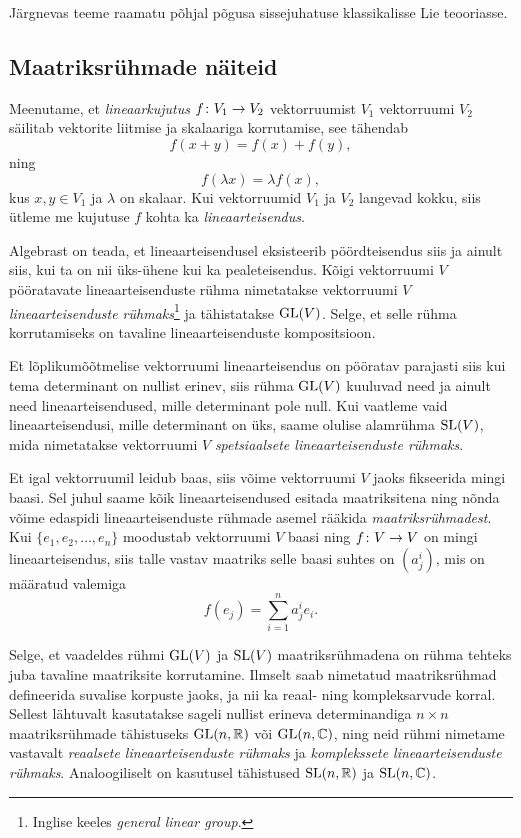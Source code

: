Järgnevas teeme raamatu \cite{johan1989survey} põhjal põgusa sissejuhatuse
klassikalisse Lie teooriasse. 

\subsection{Maatriksrühmade näiteid}

Meenutame, et \emph{lineaarkujutus}
$f \colon V_1 \to V_2$ vektorruumist $V_1$ vektorruumi $V_2$ säilitab
vektorite liitmise ja skalaariga korrutamise, see tähendab
\[ f(x + y) = f(x) + f(y), \]
ning
\[ f(\lambda x) = \lambda f(x), \]
kus $x, y \in V_1$ ja $\lambda$ on skalaar. Kui vektorruumid $V_1$ ja $V_2$
langevad kokku, siis ütleme me kujutuse $f$ kohta ka \emph{lineaarteisendus}.

Algebrast on teada, et lineaarteisendusel eksisteerib pöördteisendus siis ja
ainult siis, kui ta on nii üks-ühene kui ka pealeteisendus. Kõigi vektorruumi $V$
pööratavate lineaarteisenduste rühma nimetatakse vektorruumi $V$
\emph{lineaarteisenduste rühmaks}\footnote{Inglise keeles
\emph{general linear group}.} ja tähistatakse $\operatorname{GL}(V)$. Selge, et selle
rühma korrutamiseks on tavaline lineaarteisenduste kompositsioon.

Et lõplikumõõtmelise vektorruumi lineaarteisendus on pööratav parajasti siis
kui tema determinant on nullist erinev, siis rühma $\operatorname{GL}(V)$ kuuluvad
need ja ainult need lineaarteisendused, mille determinant pole null.
Kui vaatleme vaid lineaarteisendusi, mille determinant on üks, saame olulise
alamrühma $\operatorname{SL}(V)$, mida nimetatakse vektorruumi $V$
\emph{spetsiaalsete lineaarteisenduste rühmaks}.

Et igal vektorruumil leidub baas, siis võime vektorruumi $V$ jaoks
fikseerida mingi baasi. Sel juhul
saame kõik lineaarteisendused esitada maatriksitena ning nõnda võime
edaspidi lineaarteisenduste rühmade asemel rääkida \emph{maatriksrühmadest}.
Kui $\{e_1, e_2, \dots, e_n\}$ moodustab vektorruumi $V$ baasi ning
$f \colon V \to V$ on mingi lineaarteisendus, siis talle vastav maatriks
selle baasi suhtes on $(a^i_j)$, mis on määratud valemiga
\[ f(e_j) = \sum_{i=1}^{n} a^i_j e_i. \]

Selge, et vaadeldes rühmi $\operatorname{GL}(V)$ ja $\operatorname{SL}(V)$ maatriksrühmadena
on rühma tehteks juba tavaline maatriksite korrutamine. Ilmselt saab
nimetatud maatriksrühmad defineerida suvalise korpuste jaoks, ja nii ka
reaal- ning kompleksarvude korral. Sellest lähtuvalt kasutatakse sageli
nullist erineva determinandiga $n \times n$ maatriksrühmade tähistuseks
$\operatorname{GL}(n, \mathbb{R})$ või $\operatorname{GL}(n, \mathbb{C})$, ning neid rühmi nimetame vastavalt
\emph{reaalsete lineaarteisenduste rühmaks} ja \emph{komplekssete
lineaarteisenduste rühmaks}. Analoogiliselt on kasutusel tähistused
$\operatorname{SL}(n, \mathbb{R})$ ja $\operatorname{SL}(n, \mathbb{C})$.

